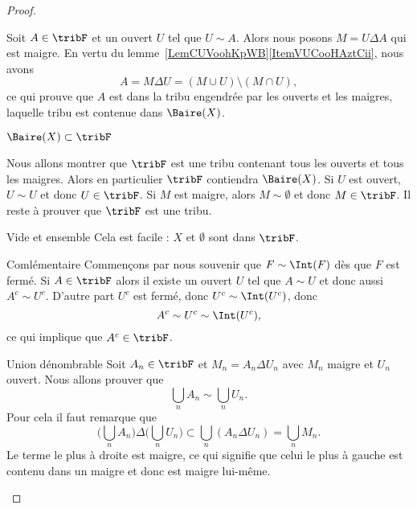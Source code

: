 \begin{proof}
\begin{subproof}
            Soit \( A\in\tribF\) et un ouvert \( U\) tel que \( U\sim A\). Alors nous posons \( M=U\Delta A\) qui est maigre. En vertu du lemme~\ref{LemCUVoohKpWB}\ref{ItemVUCooHAztCii}, nous avons
            \begin{equation}
                A=M\Delta U=(M\cup U)\setminus(M\cap U),
            \end{equation}
            ce qui prouve que \( A\) est dans la tribu engendrée par les ouverts et les maigres, laquelle tribu est contenue dans \( \Baire(X)\).
        \item[\( \Baire(X)\subset\tribF\)]

            Nous allons montrer que \( \tribF\) est une tribu contenant tous les ouverts et tous les maigres. Alors en particulier \( \tribF\) contiendra \( \Baire(X)\). Si \( U\) est ouvert, \( U\sim U\) et donc \( U\in\tribF\). Si \( M \) est maigre, alors \( M\sim\emptyset\) et donc \( M\in\tribF\). Il reste à prouver que \( \tribF\) est une tribu.
            \begin{subproof}
            \item[Vide et ensemble] Cela est facile : \( X\) et \( \emptyset\) sont dans \( \tribF\).
            \item[Comlémentaire] Commençons par nous souvenir que \( F\sim\Int(F)\) dès que \( F\) est fermé. Si \( A\in\tribF\) alors il existe un ouvert \( U\) tel que \( A\sim U\) et donc aussi \( A^c\sim U^c\). D'autre part \( U^c\) est fermé, donc \( U^c\sim\Int(U^c)\), donc
                \begin{equation}
                    A^c\sim U^c\sim\Int(U^c),
                \end{equation}
                ce qui implique que \( A^c\in\tribF\).
            \item[Union dénombrable] Soit \( A_n\in\tribF\) et \( M_n=A_n\Delta U_n\) avec \( M_n\) maigre et \( U_n\) ouvert. Nous allons prouver que
                \begin{equation}
                    \bigcup_nA_n\sim\bigcup_nU_n.
                \end{equation}
                Pour cela il faut remarque que
                \begin{equation}
                    \Big( \bigcup_nA_n \Big)\Delta\Big( \bigcup_nU_n \Big)\subset\bigcup_n(A_n\Delta U_n)=\bigcup_nM_n.
                \end{equation}
                Le terme le plus à droite est maigre, ce qui signifie que celui le plus à gauche est contenu dans un maigre et donc est maigre lui-même.
            \end{subproof}
    \end{subproof}
\end{proof}

